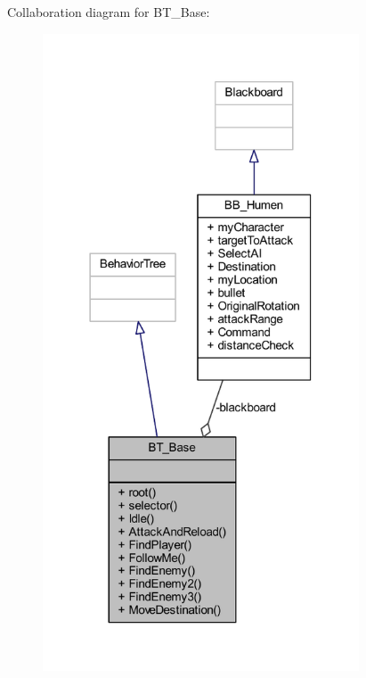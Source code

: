 Collaboration diagram for B\+T\+\_\+\+Base\+:\nopagebreak
\begin{figure}[H]
\begin{center}
\leavevmode
\includegraphics[width=266pt]{class_b_t___base__coll__graph}
\end{center}
\end{figure}
